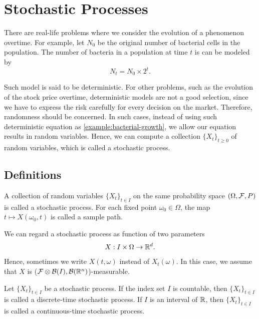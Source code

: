 \section{Stochastic Processes}
\label{subsection:stochastic-processes}
There are real-life problems where we consider the evolution of a phenomenon overtime. For example, let $N_0$ be the original number of bacterial cells in the population. The number of bacteria in a population at time $t$ is can be modeled by
\begin{equation}
 \label{example:bacterial-growth}
 N_t = N_0\times 2^t.
\end{equation}

Such model is said to be deterministic. For other problems, such as the evolution of the stock price overtime, deterministic models are not a good selection, since we have to express the risk carefully for every decision on the market. Therefore, randomness should be concerned. In such cases, instead of using such deterministic equation as \ref{example:bacterial-growth}, we allow our equation results in random variables. Hence, we can compute a collection $\{X_t\}_{t\ge0}$ of random variables, which is called a stochastic process.

\subsection{Definitions}

\begin{definition}
 \label{definition:stochastic-process}
 A collection of random variables $\{X_t\}_{t\in I}$ on the same probability space $(\Omega,\mathcal{F}, P)$ is called a stochastic process. For each fixed point $\omega_0\in\Omega$, the map $t\mapsto X(\omega_0, t)$ is called a sample path.
\end{definition}

\begin{remark}
 We can regard a stochastic process as function of two parameters
 $$X:I\times\Omega \to \mathbb{R}^d.$$
 Hence, sometimes we write $X(t,\omega)$ instead of $X_t(\omega)$. In this case, we assume that $X$ is ($\mathcal{F}\otimes\mathcal{B}(I),\mathcal{B}(\mathbb{R}^n)$)-measurable.
\end{remark}

\begin{definition}
 Let $\{X_t\}_{t\in I}$ be a stochastic process. If the index set $I$ is countable, then $\{X_t\}_{t\in I}$ is called a discrete-time stochastic process. If $I$ is an interval of $\mathbb{R}$, then $\{X_t\}_{t\in I}$ is called a continuous-time stochastic process.
\end{definition}

